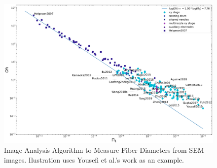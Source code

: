 \begin{figure}[!th]
\centering
\includegraphics[width=\textwidth]{./Figures/plt_Pi1_vs_Oh.png}
\decoRule
\caption[Image Analysis Algorithm to Measure Fiber Diameters from SEM images]{Image Analysis Algorithm to Measure Fiber Diameters from SEM images. Ilustration uses Yousefi et al.'s work as an example. \cite{Helgeson2007,
  Yang2019,Fattahi2017,Shin2019,Wang2015,Parajuli2016,Zheng2010,Fuh2011,Dalton2015,
  Ru2014,Xue2014,Wang2017,Xu2014,Liu2013,Pan2014,Canton2014,Chakraborty2009,Gupta2007,
  He2018,Zhou2011,Chen2013,Williams2018,Choi2017,Pan2019,Lei2015,Lim2019,Park2020,
  Fuh2012,Flores2017,Chang2010,Xu2019,Zhang2019,Shin2018,Fuh2015,Nagle2019,Zheng2012,
  Kameoka2003a,Liu2014,E.King2019,Hochleitner2017,Madou2011,Jiang2018,Husain2016,
  ElectrospinTech2015,Brown2011,Kolan2018,Chang2011,Beachley2011,Camillo2013,Kameoka2003,
  Bu2012,Lee2012,Huang2015,Coppola2020,CisquellaSerra2019,Ruggieri2013,Hochleitner2014,
  Zhu2016,Brown2014,Chang2008,Sonntag2020,Kim2018,Deng2020,Han2019,George2020,Sun2006a,
  Pan2015,Shen2016,Strauss2019,Fuh2013,Sarkar2007,You2017,Wang2018a,Zheng2014,Song2015,
  GaofengZheng2010,Liu2015a,Min2013,Luo2016,Yousefi2019,Cardenas2017,Coppola2014}}
\label{fig:plt_Pi1_vs_Oh}
\end{figure}